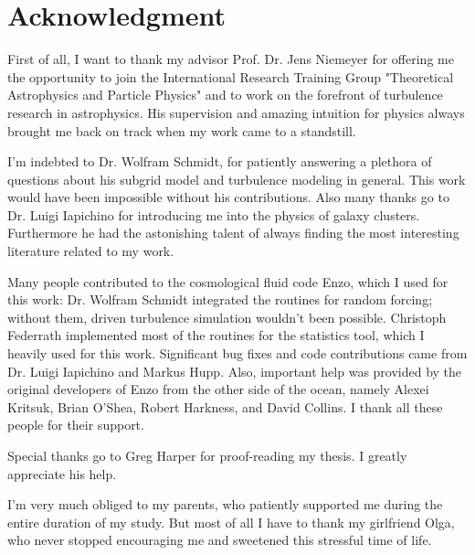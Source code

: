 \chapter*{Acknowledgment}
First of all, I want to thank my advisor Prof. Dr. Jens Niemeyer for offering
me the opportunity to join the 
International Research Training Group "Theoretical Astrophysics and Particle
Physics" and to work on the forefront of turbulence research in astrophysics.
His supervision and amazing intuition for physics always brought me back on
track when my work came to a standstill.

I'm indebted to Dr. Wolfram Schmidt, for patiently answering a
plethora of questions about his subgrid model and turbulence modeling in
general. This work would have been impossible without his contributions.
Also many thanks go to Dr. Luigi Iapichino for introducing me into the physics
of galaxy clusters. Furthermore he had the astonishing talent of always finding
the most interesting literature related to my work.

Many people contributed to the cosmological fluid code Enzo, which I used for
this work: Dr. Wolfram Schmidt integrated the routines for random forcing;
without them, driven turbulence simulation wouldn't been possible.
Christoph Federrath implemented most of the routines for the statistics tool,
which I heavily used for this work. Significant bug fixes and code contributions
came from Dr. Luigi Iapichino and Markus Hupp. Also, important help was 
provided by the original developers of Enzo from the other side of the ocean,
namely Alexei Kritsuk, Brian O'Shea, Robert Harkness, and David Collins. 
I thank all these people for their support. 

Special thanks go to Greg Harper for proof-reading my thesis. I greatly
appreciate his help. 

I'm very much obliged to my parents, who patiently supported me
during the entire duration of my study. But most of all I have to thank my
girlfriend Olga, who never stopped encouraging me and sweetened this
stressful time of life. 
 




  